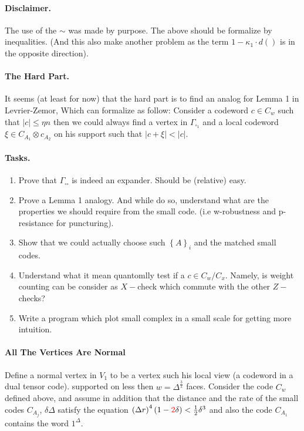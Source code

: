 \documentclass{article}
\begin{document}
\begin{multicols*}{2}
	\paragraph{Disclaimer.} The use of the $\sim$ was  made by purpose. The above should be formalize by inequalities. (And this also make another problem as 
	the term $ 1 - \kappa_{1} \cdot d\left(  \right) $ is in the opposite direction). 
	\paragraph{The Hard Part.} It seems (at least for now) that the hard part is to find an analog for Lemma 1 in Levrier-Zemor, Which can formalize 
	as follow: Consider a codeword $c \in C_{w}$ such that $|c| \le \eta n $ then we could always find a vertex in $\Gamma_{\square_{1}} $
	and a local codeword $\xi \in C_{A_1} \otimes c_{A_2} $ on his support such that $|c + \xi| < |c| $.     
      

	\paragraph{Tasks.}
	\begin{enumerate}
	  \item Prove that $\Gamma_{\square \square } $ is indeed an expander. Should be (relative) easy.
	  \item Prove a Lemma 1 analogy. And while do so, understand what are the properties we should require from the small code.
	    (i.e w-robustness and p-resistance for puncturing). 
	  \item Show that we could actually choose such $\left\{ A \right\}_{i}$ and the matched small codes.
	  \item Understand what it mean quantomlly test if a $c \in C_{w}/ C_{x}$. Namely, is weight counting can be consider as 
	    $X-$check which commute with the other $Z-$checks? 
	  \item Write a program which plot small complex in a small scale for getting more intuition. 
	\end{enumerate}

	
	\paragraph{All The Vertices Are Normal } Define a normal vertex in $ V_{1} $ to be a vertex such his local view (a codeword in a dual tensor code). 
	supported on less then $w = \Delta^\frac{3}{2}$ faces.
	Consider the code $C_{w}$ defined above, and assume in addition that the distance and the rate of 
	the small codes $C_{A_{j}}$, $\delta \Delta$ satisfy the equation $ \left(\Delta r\right)^{4}\left(1 - \color{red}2\color{black}\delta\right) < \frac{1}{2}\delta^{3} $ and also the code $ C_{A_{1}}  $ 
      contains the word $ 1^{\Delta} $.



\end{multicols*}
\end{document}
